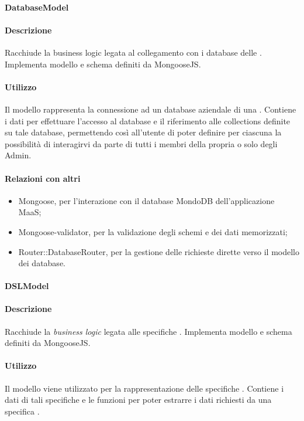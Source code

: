 \paragraph{DatabaseModel}
\paragraph*{Descrizione}

Racchiude la business logic legata al collegamento con i database delle . Implementa modello e schema definiti da MongooseJS.

\paragraph*{Utilizzo}
Il modello rappresenta la connessione ad un database aziendale di una . Contiene i dati per effettuare l'accesso al database e il riferimento alle collections definite su tale database, permettendo così all'utente di poter definire per ciascuna  la possibilità di interagirvi da parte di tutti i membri della propria  o solo degli Admin.

\paragraph*{Relazioni con altri }
\begin{itemize}
\item Mongoose, per l'interazione con il database MondoDB dell'applicazione MaaS;
\item Mongoose-validator, per la validazione degli schemi e dei dati memorizzati;
\item Router::DatabaseRouter, per la gestione delle richieste dirette verso il modello dei database.
\end{itemize}

\paragraph{DSLModel}
\paragraph*{Descrizione}

Racchiude la \textit{business logic} legata alle specifiche . Implementa modello e schema definiti da MongooseJS.

\paragraph*{Utilizzo}
Il modello viene utilizzato per la rappresentazione delle specifiche . Contiene i dati di tali specifiche e le funzioni per poter estrarre i dati richiesti da una specifica .

